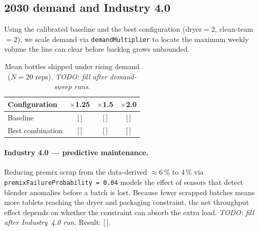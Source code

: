 \subsection{2030 demand and Industry 4.0}
\label{sec:demand40}
Using the calibrated baseline and the best configuration (dryer$=2$,
clean-team$=2$), we scale demand via \texttt{demandMultiplier} to locate the
maximum weekly volume the line can clear before backlog grows unbounded.

\begin{table}[H]
\centering
\caption{Mean bottles shipped under rising demand ($N=20$ reps).
         \emph{TODO: fill after demand-sweep runs.}}
\label{tab:demand}
\begin{tabularx}{\textwidth}{l c c c}
\toprule
Configuration & $\times$1.25 & $\times$1.5 & $\times$2.0 \\
\midrule
Baseline         & [\,] & [\,] & [\,] \\
Best combination & [\,] & [\,] & [\,] \\
\bottomrule
\end{tabularx}
\end{table}

\paragraph{Industry 4.0 --- predictive maintenance.}
Reducing premix scrap from the data-derived \(\approx\)6\,\% to 4\,\%
via \texttt{premixFailureProbability\,=\,0.04} models the effect of
sensors that detect blender anomalies before a batch is lost.
Because fewer scrapped batches means more tablets reaching the dryer and
packaging constraint, the net throughput effect depends on whether the
constraint can absorb the extra load.
\emph{TODO: fill after Industry~4.0 run.} Result: [\,].

